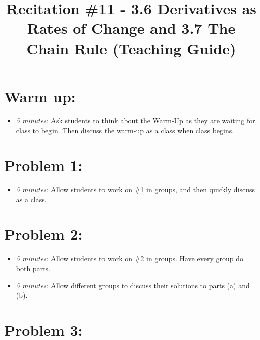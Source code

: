 \documentclass[handout,nooutcomes]{ximera}
\title{Recitation \#11 - 3.6 Derivatives as Rates of Change and 3.7 The Chain Rule (Teaching Guide)}
\begin{document}
\begin{abstract}		\end{abstract}
\maketitle


\section*{Warm up:} 
	
	\begin{itemize}
	
	\item  \emph{5 minutes}:  Ask students to think about the Warm-Up as they are waiting for class to begin.  Then discuss the warm-up as a class when class begins.
	
	
	
	\end{itemize}


\section*{Problem 1:}

	\begin{itemize}
	
	\item  \emph{5 minutes}:  Allow students to work on \#1 in groups, and then quickly discuss as a class.  
	
	\end{itemize}



\section*{Problem 2:}

	\begin{itemize}
	
	\item  \emph{5 minutes}:  Allow students to work on \#2 in groups.  Have every group do both parts.
		
	\item  \emph{5 minutes}:  Allow different groups to discuss their solutions to parts (a) and (b).  
			
	\end{itemize}
	
	
	
\section*{Problem 3:}
\end{document}
